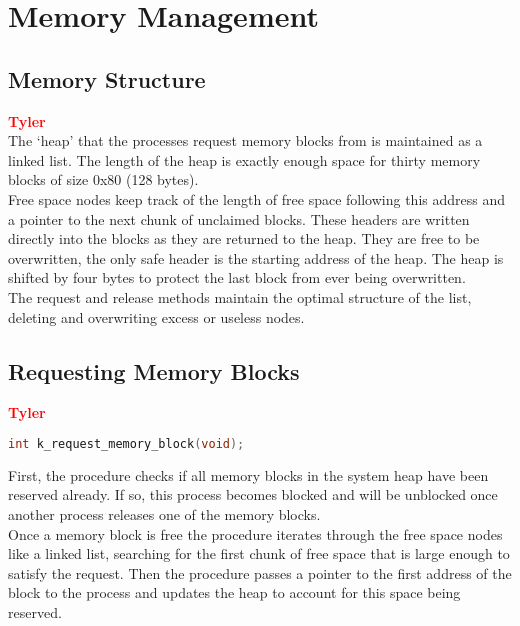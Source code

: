 \documentclass[12pt]{report}
\begin{document}
\section{Memory Management}

\subsection{Memory Structure}

\textcolor{red}{\textbf{Tyler}} \\
The `heap' that the processes request memory blocks from is maintained as a linked list. The length of the heap is exactly enough space for thirty memory blocks of size 0x80 (128 bytes).\\

Free space nodes keep track of the length of free space following this address and a pointer to the next chunk of unclaimed blocks. These headers are written directly into the blocks as they are returned to the heap. They are free to be overwritten, the only safe header is the starting address of the heap. The heap is shifted by four bytes to protect the last block from ever being overwritten. \\

The request and release methods maintain the optimal structure of the list, deleting and overwriting excess or useless nodes.\\


\subsection{Requesting Memory Blocks}

\textcolor{red}{\textbf{Tyler}} \\
\begin{minipage}{\textwidth}
\begin{lstlisting}[language=C, frame=single]
int k_request_memory_block(void);
\end{lstlisting}
\end{minipage}

First, the procedure checks if all memory blocks in the system heap have been reserved already. If so, this process becomes blocked and will be unblocked once another process releases one of the memory blocks. \\
Once a memory block is free the procedure iterates through the free space nodes like a linked list, searching for the first chunk of free space that is large enough to satisfy the request. Then the procedure passes a pointer to the first address of the block to the process and updates the heap to account for this space being reserved. \\
\end{document}
